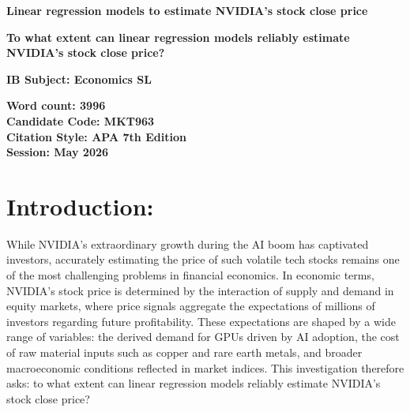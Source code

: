 \documentclass[12pt]{article}
\begin{document}
    
    \begin{center}
    \textbf{Linear regression models to estimate NVIDIA's stock close price}
    \end{center}
    
    \vspace{1em}
    
    \begin{center}
    \textbf{To what extent can linear regression models reliably estimate NVIDIA's stock close price?}
    \end{center}
    
    \vspace{1em}
    
    \begin{center}
    \textbf{IB Subject: Economics SL}
    
    \vspace{1em}
    
    \textbf{Word count: 3996} \\
    \textbf{Candidate Code: MKT963} \\
    \textbf{Citation Style: APA 7th Edition } \\
    \textbf{Session: May 2026}
    \end{center}
    
    \vspace{2em}
    
    \newpage
    
        \renewcommand{\contentsname}{Table Of Contents}
        
        \tableofcontents
    
    \newpage
    
    \section{Introduction:}
    
    While NVIDIA's extraordinary growth during the AI boom has captivated investors, accurately estimating the price of such volatile tech stocks remains one of the most challenging problems in financial economics. In economic terms, NVIDIA's stock price is determined by the interaction of supply and demand in equity markets, where price signals aggregate the expectations of millions of investors regarding future profitability. These expectations are shaped by a wide range of variables: the derived demand for GPUs driven by AI adoption, the cost of raw material inputs such as copper and rare earth metals, and broader macroeconomic conditions reflected in market indices. This investigation therefore asks: to what extent can linear regression models reliably estimate NVIDIA's stock close price?
    
\end{document}
